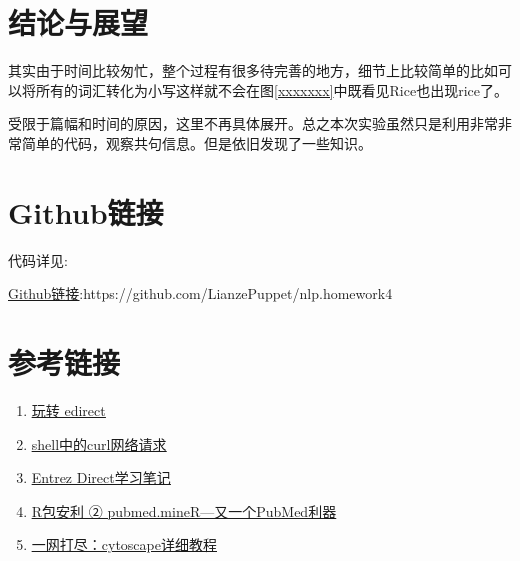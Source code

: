 \documentclass[12pt]{article}
\begin{document}
	\section{结论与展望}
	其实由于时间比较匆忙，整个过程有很多待完善的地方，细节上比较简单的比如可以将所有的词汇转化为小写这样就不会在图\ref{xxxxxxx}中既看见Rice也出现rice了。\par
	受限于篇幅和时间的原因，这里不再具体展开。总之本次实验虽然只是利用非常非常简单的代码，观察共句信息。但是依旧发现了一些知识。\par
	
	\section{Github链接}
	代码详见:\par
	\href{https://github.com/LianzePuppet/nlp.homework4}{\underline{Github链接}}:https://github.com/LianzePuppet/nlp.homework4

\section{参考链接}
\begin{enumerate}
\item \href{https://my.oschina.net/indexofire/blog/1492062}{\underline{玩转 edirect}}
\item \href{https://blog.csdn.net/u012390519/article/details/74231606}
{\underline{shell中的curl网络请求}}
\item \href{https://blog.csdn.net/zhanyongjia_cnu/article/details/50717717}
{\underline{Entrez Direct学习笔记}}
\item \href{https://mp.weixin.qq.com/s/bndecTSABox2dcr7aoheig}
{\underline{R包安利 ② pubmed.mineR—又一个PubMed利器}}
\item \href{https://zhuanlan.zhihu.com/p/220527695}
{\underline{一网打尽：cytoscape详细教程}}
\end{enumerate}

\end{document}
